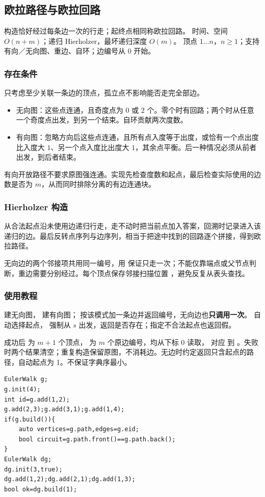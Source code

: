 \subsection{欧拉路径与欧拉回路}
\label{algo:euler-walk}
\AlgorithmInfo
    {构造恰好经过每条边一次的行走；起终点相同称欧拉回路。}
    {时间、空间 $O(n+m)$；递归 Hierholzer，最坏递归深度 $O(m)$。}
    {顶点 $1\ldots n$，$n\geq1$；支持有向／无向图、重边、自环；边编号从 0 开始。}

\subsubsection*{存在条件}
只考虑至少关联一条边的顶点，孤立点不影响能否走完全部边。
\begin{itemize}
    \item 无向图：这些点连通，且奇度点为 $0$ 或 $2$ 个。零个时有回路；两个时从任意一个奇度点出发，到另一个结束。自环贡献两次度数。
    \item 有向图：忽略方向后这些点连通，且所有点入度等于出度，或恰有一个点出度比入度大 $1$、另一个点入度比出度大 $1$，其余点平衡。后一种情况必须从前者出发，到后者结束。
\end{itemize}
有向开放路径不要求原图强连通。实现先检查度数和起点，最后检查实际使用的边数是否为 $m$，从而同时排除分离的有边连通块。

\subsubsection*{Hierholzer 构造}
从合法起点沿未使用边递归行走，走不动时把当前点加入答案，回溯时记录进入该递归的边。最后反转点序列与边序列，相当于把途中找到的回路逐个拼接，得到欧拉路径。

无向边的两个邻接项共用同一编号，用  保证只走一次；不能仅靠端点或父节点判断，重边需要分别经过。每个顶点保存邻接扫描位置 ，避免反复从表头查找。

\subsubsection*{使用教程}
 建无向图， 建有向图； 按该模式加一条边并返回编号，无向边也\textbf{只调用一次}。 自动选择起点， 强制从 $s$ 出发，返回是否存在；指定不合法起点也返回假。

成功后  为 $m+1$ 个顶点， 为 $m$ 个原边编号，均从下标 0 读取， 对应  到 。失败时两个结果清空；重复构造保留原图，不消耗边。无边时约定返回只含起点的路径，自动起点为 1。不保证字典序最小。
\begin{lstlisting}[style=mtycpp,numbers=none]
EulerWalk g;
g.init(4);
int id=g.add(1,2);
g.add(2,3);g.add(3,1);g.add(1,4);
if(g.build()){
	auto vertices=g.path,edges=g.eid;
	bool circuit=g.path.front()==g.path.back();
}
EulerWalk dg;
dg.init(3,true);
dg.add(1,2);dg.add(2,1);dg.add(1,3);
bool ok=dg.build(1);
\end{lstlisting}

